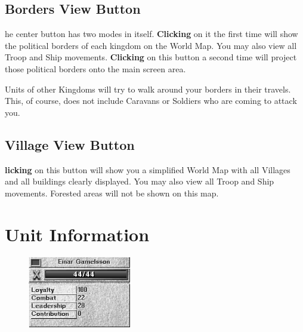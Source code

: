 \subsection{\textsf{Borders View Button}}


he center button has two modes in itself. \textbf{Clicking} on it the first time will show the political borders of each kingdom on the World Map. You may also view all Troop and Ship movements. \textbf{Clicking} on this button a second time will project those political borders onto the main screen area.

Units of other Kingdoms will try to walk around your borders in their travels. This, of course, does not include Caravans or Soldiers who are coming to attack you.

\subsection{\textsf{Village View Button}}


\textbf{licking} on this button will show you a simplified World Map with all Villages and all buildings clearly displayed. You may also view all Troop and Ship movements. Forested areas will not be shown on this map.

\section{\textsf{Unit Information}}

\begin{figure}
    \vspace{-20pt}
    \begin{center}
        \includegraphics[width=0.4\textwidth]{Iunitinfo} %
    \end{center}
    \vspace{-20pt}
\end{figure}

